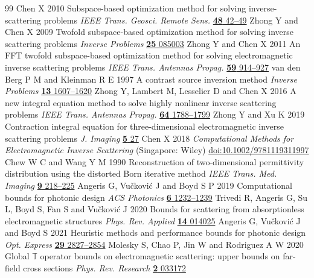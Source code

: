 \begin{thebibliography}{99}
 Chen X 2010 Subspace-based optimization method for solving inverse-scattering problems \emph{IEEE Trans. Geosci. Remote Sens.} \href{https://doi.org/10.1109/TGRS.2009.2025122}{\textbf{48} 42--49}
 Zhong Y and Chen X 2009 Twofold subspace-based optimization method for solving inverse scattering problems \emph{Inverse Problems} \href{https://doi.org/10.1088/0266-5611/25/8/085003}{\textbf{25} 085003}
 Zhong Y and Chen X 2011 An FFT twofold subspace-based optimization method for solving electromagnetic inverse scattering problems \emph{IEEE Trans. Antennas Propag.} \href{https://doi.org/10.1109/TAP.2010.2103027}{\textbf{59} 914--927}
 van den Berg P M and Kleinman R E 1997 A contrast source inversion method \emph{Inverse Problems} \href{https://doi.org/10.1088/0266-5611/13/6/013}{\textbf{13} 1607--1620}
 Zhong Y, Lambert M, Lesselier D and Chen X 2016 A new integral equation method to solve highly nonlinear inverse scattering problems \emph{IEEE Trans. Antennas Propag.} \href{https://doi.org/10.1109/TAP.2016.2535492}{\textbf{64} 1788--1799}
 Zhong Y and Xu K 2019 Contraction integral equation for three-dimensional electromagnetic inverse scattering problems \emph{J. Imaging} \href{https://doi.org/10.3390/jimaging5020027}{\textbf{5} 27}
 Chen X 2018 \emph{Computational Methods for Electromagnetic Inverse Scattering} (Singapore: Wiley) \href{https://doi.org/10.1002/9781119311997}{doi:10.1002/9781119311997}
 Chew W C and Wang Y M 1990 Reconstruction of two-dimensional permittivity distribution using the distorted Born iterative method \emph{IEEE Trans. Med. Imaging} \href{https://doi.org/10.1109/42.56334}{\textbf{9} 218--225}
 Angeris G, Vu\v{c}kovi\'{c} J and Boyd S P 2019 Computational bounds for photonic design \emph{ACS Photonics} \href{https://doi.org/10.1021/acsphotonics.9b00154}{\textbf{6} 1232--1239}
 Trivedi R, Angeris G, Su L, Boyd S, Fan S and Vu\v{c}kovi\'{c} J 2020 Bounds for scattering from absorptionless electromagnetic structures \emph{Phys. Rev. Applied} \href{https://doi.org/10.1103/PhysRevApplied.14.014025}{\textbf{14} 014025}
 Angeris G, Vu\v{c}kovi\'{c} J and Boyd S 2021 Heuristic methods and performance bounds for photonic design \emph{Opt. Express} \href{https://doi.org/10.1364/OE.415052}{\textbf{29} 2827--2854}
 Molesky S, Chao P, Jin W and Rodriguez A W 2020 Global $\mathbb{T}$ operator bounds on electromagnetic scattering: upper bounds on far-field cross sections \emph{Phys. Rev. Research} \href{https://doi.org/10.1103/PhysRevResearch.2.033172}{\textbf{2} 033172}

\end{thebibliography}
